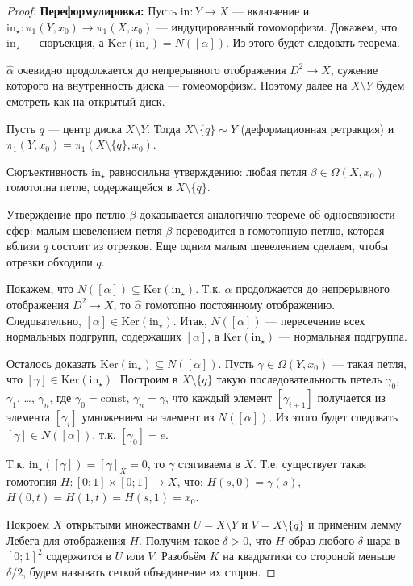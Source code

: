 \documentclass[12pt,a4paper]{article}
\newcommand{\const}{\ensuremath{\mathrm{const}}\xspace}
\newcommand{\Ker}{\ensuremath{\mathrm{Ker}}\xspace}
\newcommand{\incl}{\mathrm{in}}
\begin{document}
    \begin{proof}
        \textbf{Переформулировка:} Пусть $\incl: Y \to X$ --- включение и $\incl_\star: \pi_1(Y, x_0) \to \pi_1(X, x_0)$ --- индуцированный гомоморфизм. Докажем, что $\incl_\star$ --- сюръекция, а $\Ker(\incl_\star) = N([\alpha])$. Из этого будет следовать теорема.
        
        $\widehat{\alpha}$ очевидно продолжается до непрерывного отображения $D^2 \to X$, сужение которого на внутренность диска --- гомеоморфизм. Поэтому далее на $X\setminus Y$ будем смотреть как на открытый диск.
        
        Пусть $q$ --- центр диска $X\setminus Y$. Тогда $X\setminus \{q\} \sim Y$ (деформационная ретракция) и $\pi_1(Y , x_0) = \pi_1(X \setminus \{q\}, x_0)$.
        
        Сюръективность $\incl_\star$ равносильна утверждению: любая петля $\beta \in \Omega(X, x_0)$ гомотопна петле, содержащейся в $X \setminus \{q\}$.
        
        Утверждение про петлю $\beta$ доказывается аналогично теореме об односвязности сфер: малым шевелением петля $\beta$ переводится в гомотопную петлю, которая вблизи $q$ состоит из отрезков. Еще одним малым шевелением сделаем, чтобы отрезки обходили $q$.

        Покажем, что $N([\alpha]) \subseteq \Ker(\incl_\star)$. Т.к. $\widehat{\alpha}$ продолжается до непрерывного отображения $D^2 \to X$, то $\widehat{\alpha}$ гомотопно постоянному отображению. Следовательно, $[\alpha] \in \Ker(\incl_\star)$. Итак, $N([\alpha])$ --- пересечение всех нормальных подгрупп, содержащих $[\alpha]$, а $\Ker(\incl_\star)$ --- нормальная подгруппа.

        Осталось доказать $\Ker(\incl_\star) \subseteq N([\alpha])$. Пусть $\gamma \in \Omega(Y, x_0)$ --- такая петля, что $[\gamma] \in \Ker(\incl_\star)$. Построим в $X \setminus \{q\}$ такую последовательность петель $\gamma_0$, $\gamma_1$, \dots, $\gamma_n$, где $\gamma_0 = \const$, $\gamma_n = \gamma$, что каждый элемент $[\gamma_{i+1}]$ получается из элемента $[\gamma_i]$ умножением на элемент из $N([\alpha])$. Из этого будет следовать $[\gamma] \in N([\alpha])$, т.к. $[\gamma_0] = e$.

        Т.к. $\incl_\star([\gamma]) = [\gamma]_X = 0$, то $\gamma$ стягиваема в $X$. Т.е. существует такая гомотопия $H: [0; 1] \times [0; 1] \to X$, что: $H(s, 0) = \gamma(s)$, $H(0, t) = H(1, t) = H(s, 1) = x_0$.
        
        Покроем $X$ открытыми множествами $U = X \setminus Y$ и $V = X \setminus \{q\}$ и применим лемму Лебега для отображения $H$. Получим такое $\delta > 0$, что $H$-образ любого $\delta$-шара в $[0; 1]^2$ содержится в $U$ или $V$. Разобьём $K$ на квадратики со стороной меньше $\delta/2$, будем называть сеткой объединение их сторон.


\end{proof}
\end{document}
